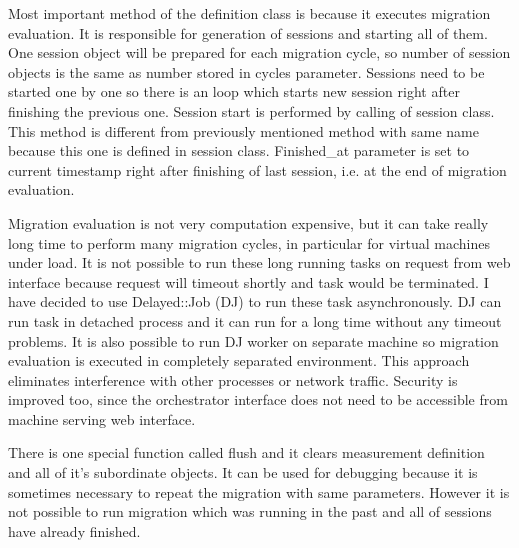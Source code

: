 Most important method of the definition class is  because it executes migration evaluation. It is responsible for generation of sessions and starting all of them. One session object will be prepared for each migration cycle, so number of session objects is the same as number stored in cycles parameter. Sessions need to be started one by one so there is an loop which starts new session right after finishing the previous one. Session start is performed by calling  of session class. This method is different from previously mentioned method with same name because this one is defined in session class.
Finished\_at parameter is set to current timestamp right after finishing of last session, i.e. at the end of migration evaluation. 

Migration evaluation is not very computation expensive, but it can take really long time to perform many migration cycles, in particular for virtual machines under load. It is not possible to run these long running tasks on request from web interface because request will timeout shortly and task would be terminated. I have decided to use Delayed::Job (\Ac{DJ}) to run these task asynchronously.
\Ac{DJ} can run task in detached process and it can run for a long time without any timeout problems. It is also possible to run \Ac{DJ} worker on separate machine so migration evaluation is executed in completely separated environment. This approach eliminates interference with other processes or network traffic. Security is improved too, since the orchestrator interface does not need to be accessible from machine serving web interface.

There is one special function called flush and it clears measurement definition and all of it's subordinate objects. It can be used for debugging because it is sometimes necessary to repeat the migration with same parameters. However it is not possible to run migration which was running in the past and all of sessions have already finished.

